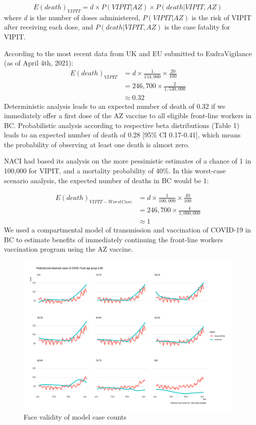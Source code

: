 \documentclass[]{interact}
\theoremstyle{plain}%
\theoremstyle{definition}
\theoremstyle{remark}
\begin{document}
\[
E(death)_{VIPIT}  = d \times P(VIPIT|AZ) \times P(death|VIPIT, AZ)
\] where \(d\) is the number of doses administered, \(P(VIPIT|AZ)\) is
the risk of VIPIT after receiving each dose, and \(P(death|VIPIT, AZ)\)
is the case fatality for VIPIT.

According to the most recent data from UK and EU submitted to
EudraVigilance (as of April 4th, 2021): \[
\begin{aligned}
E(death)_{VIPIT} & = d \times \frac{1}{153,000} \times \frac{20}{100} \\
& = 246,700 \times \frac{2}{1,530,000} \\
& \approx 0.32
\end{aligned}
\] Deterministic analysis leads to an expected number of death of 0.32
if we immediately offer a first dose of the AZ vaccine to all eligible
front-line workers in BC. Probabilistic analysis according to respective
beta distributions (Table 1) leads to an expected number of death of
0.28 {[}95\% CI 0.17-0.41{]}, which means the probability of observing
at least one death is almost zero.

NACI had based its analysis on the more pessimistic estimates of a
chance of 1 in 100,000 for VIPIT, and a mortality probability of 40\%.
In this worst-case scenario analysis, the expected number of deaths in
BC would be 1:

\[
\begin{aligned}
E(death)_{VIPIT-Worst Case} & = d \times \frac{1}{100,000} \times \frac{40}{100} \\
& = 246,700 \times \frac{4}{1,000,000} \\
& \approx 1
\end{aligned}
\] We used a compartmental model of transmission and vaccination of
COVID-19 in BC to estimate benefits of immediately continuing the
front-line workers vaccination program using the AZ vaccine.

\begin{figure}

{\centering \includegraphics[width=1\linewidth]{../figures/fig-validation} 

}

\caption{Face validity of model case counts}\label{fig:figValidation}
\end{figure}
\end{document}
